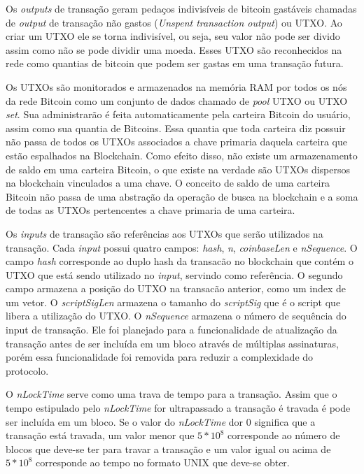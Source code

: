 \documentclass[conference,compsoc]{IEEEtran}
\begin{document}
Os \textit{outputs} de transação geram pedaços indivisíveis de bitcoin gastáveis chamadas de  \textit{output} de transação não gastos (\textit{Unspent transaction output}) ou UTXO. Ao criar um UTXO ele se torna indivisível, ou seja, seu valor não pode ser divido assim como não se pode dividir uma moeda. Esses UTXO são reconhecidos na rede como quantias de bitcoin que podem ser gastas em uma transação futura.

Os UTXOs são monitorados e armazenados na memória RAM por todos os nós da rede Bitcoin como um conjunto de dados chamado de \textit{pool} UTXO ou UTXO \textit{set}. Sua administrarão é feita automaticamente pela carteira Bitcoin do usuário, assim como sua quantia de Bitcoins. Essa quantia que toda carteira diz possuir não passa de todos os UTXOs associados a chave primaria daquela carteira que estão espalhados na Blockchain. Como efeito disso, não existe um armazenamento de saldo em uma carteira Bitcoin, o que existe na verdade são UTXOs dispersos na blockchain vinculados a uma chave. O conceito de saldo de uma carteira Bitcoin não passa de uma abstração da operação de busca na blockchain e a soma de todas as UTXOs pertencentes a chave primaria de uma carteira.

Os \textit{inputs} de transação são referências aos UTXOs que serão utilizados na transação. Cada \textit{input} possui quatro campos: \textit{hash}, \textit{n}, \textit{coinbaseLen} e \textit{nSequence}. O campo \textit{hash} corresponde ao duplo hash da transacão no blockchain que contém o UTXO que está sendo utilizado no \textit{input}, servindo como referência. O segundo campo armazena a posição do UTXO na transacão anterior, como um index de um vetor. O \textit{scriptSigLen} armazena o tamanho do \textit{scriptSig} que é o script que libera a utilização do UTXO. O \textit{nSequence} armazena o número de sequência do input de transação. Ele foi planejado para a funcionalidade de atualização da transação antes de ser incluída em um bloco através de múltiplas assinaturas, porém essa funcionalidade foi removida para reduzir a complexidade do protocolo.

O \textit{nLockTime} serve como uma trava de tempo para a transação. Assim que o tempo estipulado pelo \textit{nLockTime} for ultrapassado a transação é travada é pode ser incluída em um bloco. Se o valor do \textit{nLockTime} dor 0 significa que a transação está travada, um valor menor que $5*10^8$ corresponde ao número de blocos que deve-se ter para travar a transação e um valor igual ou acima de $5*10^8$ corresponde ao tempo no formato UNIX que deve-se obter.
\end{document}
